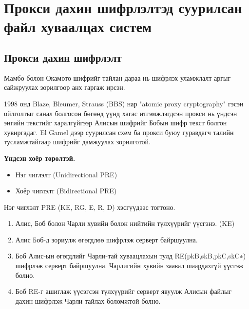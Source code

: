 
\chapter{Прокси дахин шифрлэлтэд суурилсан файл хуваалцах систем} %
\label{Chapter2} %
\pagecolor{white}

\section{Прокси дахин шифрлэлт}
Мамбо болон Окамото шифрийг тайлан дараа нь шифрлэх уламжлалт аргыг сайжруулах зорилгоор анх гаргаж ирсэн.

1998 онд Blaze, Bleumer, Strauss (BBS) нар "atomic proxy cryptography" гэсэн ойлголтыг санал болгосон бөгөөд үүнд хагас итгэмжлэгдсэн прокси нь үндсэн энгийн текстийг харалгүйгээр Алисын шифрийг Бобын шифр текст болгон хувиргадаг. El Gamel дээр суурилсан схем ба прокси буюу гуравдагч талийн тусламжтайгаар шифрийг дамжуулах зорилготой. 

\textbf{Үндсэн хоёр төрөлтэй.}
\begin{itemize}
    \item Нэг чиглэлт (Unidirectional PRE)
    \item Хоёр чиглэлт (Bidirectional PRE)
\end{itemize}

Нэг чиглэлт PRE (KE, RG, E, R, D) хэсгүүдээс тогтоно.

\begin{enumerate}
    \item Алис, Боб болон Чарли хувийн болон нийтийн түлхүүрийг үүсгэнэ. (KE)
    \item Алис Боб-д зориулж өгөгдлөө шифрлэж серверт байршуулна.
    \item Боб Алис-ын өгөгдлийг Чарли-тай хуваацлахын тулд RE(pkB,skB,pkC,skC∗) шифрлэж серверт байршуулна. Чарлигийн хувийн заавал шаардахгүй үүсгэж болно.
    \item Боб RE-г ашиглаж үүсэгсэн түлхүүрийг серверт явуулж Алисын файлыг дахин шифрлэж Чарли тайлах боломжтой болно.
\end{enumerate}

